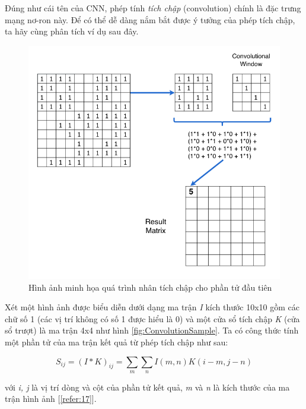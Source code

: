 \hspace{\parindent} Đúng như cái tên của CNN, phép tính \textit{tích chập} (convolution) chính là đặc trưng mạng nơ-ron này. Để có thể dễ dàng nắm bắt được ý tưởng của phép tích chập, ta hãy cùng phân tích ví dụ sau đây.

\begin{figure}[!h]
    	\centering
    		\includegraphics[width=0.9\columnwidth]{books/artificial-neural-network/chapter05/figure/convolution_example.png}
    		\centering
    	\caption{Hình ảnh minh họa quá trình nhân tích chập cho phần tử đầu tiên}
    	\label{fig:ConvolutionExample}
    \end{figure}

Xét một hình ảnh được biểu diễn dưới dạng ma trận \textit{I }kích thước 10x10 gồm các chữ số 1 (các vị trí không có số 1 được hiểu là 0) và một cửa sổ tích chập \textit{K} (cửa sổ trượt) là ma trận 4x4 như hình \ref{fig:ConvolutionSample}. Ta có công thức tính một phần tử của ma trận kết quả từ phép tích chập như sau:

\begin{equation}
S_{ij} = (I * K)_{ij} =  \sum_{m} \sum_{n} I(m,n)K(i-m,j-n)
\end{equation}

với \textit{i, j} là vị trí dòng và cột của phần tử kết quả,\textit{ m} và \textit{n} là kích thước của ma trận hình ảnh [\ref{refer:17}].

